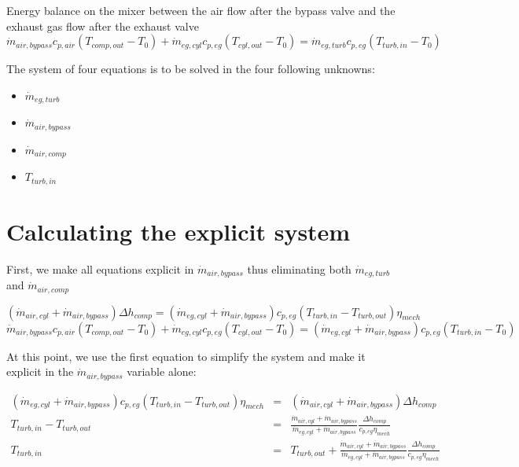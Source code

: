 \documentclass[]{article}
\begin{document}
Energy balance on the mixer between the air flow after the bypass valve and the exhaust gas flow after the exhaust valve
\begin{equation}
\dot{m}_{air,bypass} c_{p,air} (T_{comp,out} - T_0) + \dot{m}_{eg,cyl} c_{p,eg}  (T_{cyl,out} - T_0) = \dot{m}_{eg,turb} c_{p,eg} (T_{turb,in} - T_0)
\end{equation}


The system of four equations is to be solved in the four following unknowns:
\begin{itemize}
	\item $ \dot{m}_{eg,turb} $
	\item $ \dot{m}_{air,bypass} $
	\item $ \dot{m}_{air,comp} $
	\item $ T_{turb,in} $
\end{itemize}

\section{Calculating the explicit system}

First, we make all equations explicit in $ \dot{m}_{air,bypass} $ thus eliminating both 
$ \dot{m}_{eg,turb} $ and $ \dot{m}_{air,comp} $

$$
(\dot{m}_{air,cyl} + \dot{m}_{air,bypass}) \Delta h_{comp} = (\dot{m}_{eg,cyl} + \dot{m}_{air,bypass}) c_{p,eg} (T_{turb,in} - T_{turb,out}) \eta_{mech} 
$$
$$
\dot{m}_{air,bypass} c_{p,air} (T_{comp,out} - T_0) + \dot{m}_{eg,cyl} c_{p,eg}  (T_{cyl,out} - T_0)  = (\dot{m}_{eg,cyl} + \dot{m}_{air,bypass}) c_{p,eg} (T_{turb,in} - T_0)
$$

At this point, we use the first equation to simplify the system and make it explicit in the $ \dot{m}_{air,bypass} $ variable alone:

\begin{eqnarray*}
(\dot{m}_{eg,cyl} + \dot{m}_{air,bypass}) c_{p,eg} (T_{turb,in} - T_{turb,out}) \eta_{mech}  & = & (\dot{m}_{air,cyl} + \dot{m}_{air,bypass}) \Delta h_{comp} \\
T_{turb,in} - T_{turb,out} & = & \frac{\dot{m}_{air,cyl} + \dot{m}_{air,bypass}}{\dot{m}_{eg,cyl} + \dot{m}_{air,bypass}} \frac{\Delta h_{comp}}{c_{p,eg} \eta_{mech}} \\
T_{turb,in} & = & T_{turb,out} + \frac{\dot{m}_{air,cyl} + \dot{m}_{air,bypass}}{\dot{m}_{eg,cyl} + \dot{m}_{air,bypass}} \frac{\Delta h_{comp}}{c_{p,eg} \eta_{mech}}  \\
\end{eqnarray*}
\end{document}
